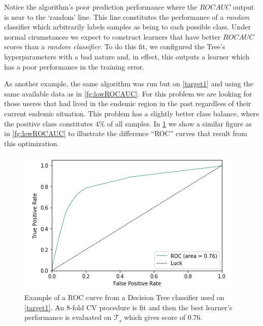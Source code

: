 Notice the algorithm's poor prediction performance where the $ROC AUC$ output is near to the `random' line.
This line constitutes the performance of a \textit{random} classifier which arbitrarily labels samples as being to each possible class.
Under normal cirumstances we expect to construct learners that have better $ROC AUC$ scores than a \textit{random classifier}.
To do this fit, we configured the Tree's hyperparameters with a bad nature and, in effect, this outputs a learner which has a poor performance in the training error.


As another example, the same algorithm was run but on \cref{target1} and using the same available data as in \cref{fg:lowROCAUC}.
For this problem we are looking for those useres that had lived in the endemic region in the past regardless of their current endemic situation.
This problem has a slightly better class balance, where the positive class constitutes $4\%$ of all samples.
In \cref{fg:highROCAUC} we show a similar figure as in \cref{fg:lowROCAUC} to illustrate the difference ``ROC'' curves that result from this optimization.

\begin{figure}[h!]
\begin{center}
\includegraphics[width=1\columnwidth]{figures/figure-highROCAUC/figure-highROCAUC}
\caption{Example of a ROC curve from a Decision Tree classifier used on \cref{target1}. An 8-fold CV procedure is fit and then the best learner's performance is evaluated on $\mathcal{T_s}$ which gives score of $0.76$.}
\label{fg:highROCAUC}
\end{center}
\end{figure}

